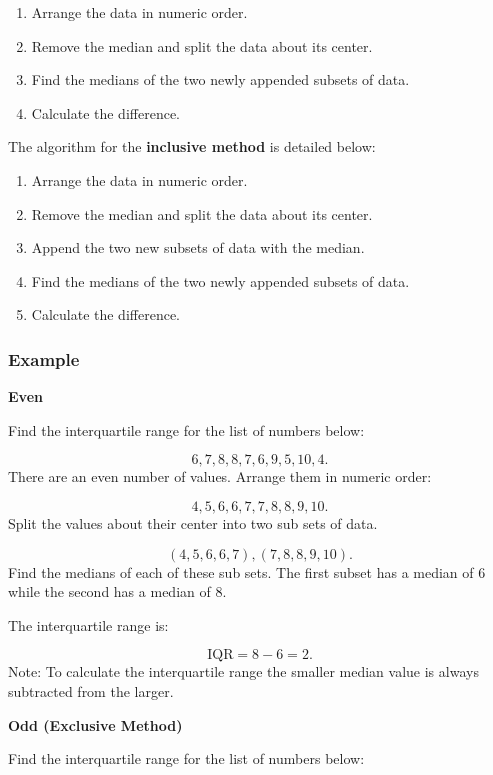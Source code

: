 \documentclass[
]{book}
\providecommand{\tightlist}{%
  \setlength{\itemsep}{0pt}\setlength{\parskip}{0pt}}
\begin{document}
\begin{enumerate}
\def\labelenumi{\arabic{enumi}.}
\tightlist
\item
  Arrange the data in numeric order.
\item
  Remove the median and split the data about its center.
\item
  Find the medians of the two newly appended subsets of data.
\item
  Calculate the difference.
\end{enumerate}

The algorithm for the \textbf{inclusive method} is detailed below:

\begin{enumerate}
\def\labelenumi{\arabic{enumi}.}
\tightlist
\item
  Arrange the data in numeric order.
\item
  Remove the median and split the data about its center.
\item
  Append the two new subsets of data with the median.
\item
  Find the medians of the two newly appended subsets of data.
\item
  Calculate the difference.
\end{enumerate}

\hypertarget{example-8}{%
\subsubsection{Example}\label{example-8}}

\textbf{Even}

Find the interquartile range for the list of numbers below:

\[6, 7, 8, 8, 7, 6, 9, 5, 10, 4. \]
There are an even number of values. Arrange them in numeric order:

\[ 4, 5, 6, 6, 7, 7, 8, 8, 9, 10.\]
Split the values about their center into two sub sets of data.

\[ (4, 5, 6, 6, 7), (7, 8, 8, 9, 10). \]
Find the medians of each of these sub sets. The first subset has a median of 6 while the second has a median of 8.

The interquartile range is:

\[ \textrm{IQR} = 8 - 6 = 2.\]
Note: To calculate the interquartile range the smaller median value is always subtracted from the larger.

\textbf{Odd (Exclusive Method)}

Find the interquartile range for the list of numbers below:
\end{document}
